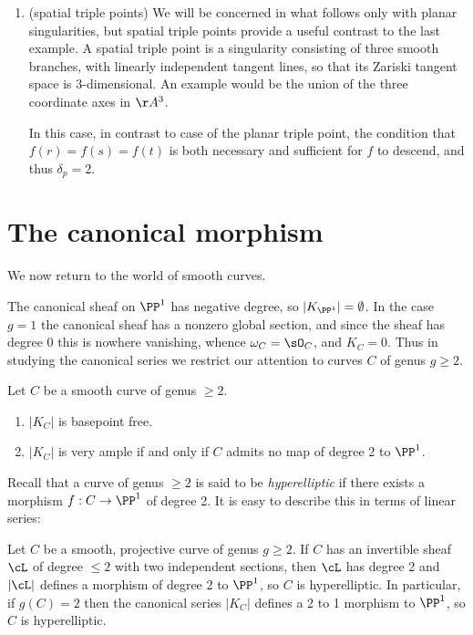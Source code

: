 \begin{enumerate}
\item (spatial triple points) We will be concerned in what follows only with planar singularities, but spatial triple points provide a useful contrast to the last example. A spatial triple point is a singularity consisting of three smooth branches, with linearly independent tangent lines, so that its Zariski tangent space is 3-dimensional. An example would be the union of the three coordinate axes in $\AA^3$.

In this case, in contrast to case of the planar triple point, the condition that $f(r)=f(s)=f(t)$ is both necessary and sufficient for $f$ to descend, and thus  $\delta_p=2$.

\end{enumerate}

\section{The canonical morphism}

We now return to the world of smooth curves.

 The canonical sheaf on $\PP^1$ has negative degree, so $|K_{\PP^1}| = \emptyset$. In the case $g=1$ the canonical sheaf     has a nonzero global section, and since the sheaf has degree 0 this is nowhere vanishing, whence
 $\omega_C = \sO_C$, and $K_C = 0$. Thus in studying the canonical series we restrict our attention to curves $C$ of genus $g\geq 2$. 
 
 \begin{theorem}\label{canonical series is very ample} Let $C$ be a smooth curve of genus $\geq 2$.
\begin{enumerate}
 \item $|K_C|$ is basepoint free.
 \item $|K_C|$ is very ample if and only if $C$ admits no map of degree 2 to $\PP^1$.
\end{enumerate}
\end{theorem}

Recall that a curve of genus $\geq 2$
is said to be \emph{hyperelliptic} if there exists a morphism $f: C \to \PP^1$ of degree 2. 
It is easy to describe this in terms of linear series:

\begin{lemma}\label{deg 2 morphism}
Let $C$ be a smooth, projective curve of genus $g\geq 2$. If $C$ has an invertible sheaf $\cL$ of degree $\leq 2$ with two independent sections, then $\cL$ has degree 2 and
$|\cL|$ defines a morphism of degree 2 to $\PP^{1}$, so $C$ is hyperelliptic. In particular, if $g(C) = 2$ then the canonical series $|K_{C}|$ defines a 2 to 1 morphism to $\PP^{1}$, so $C$ is hyperelliptic.
\end{lemma}


